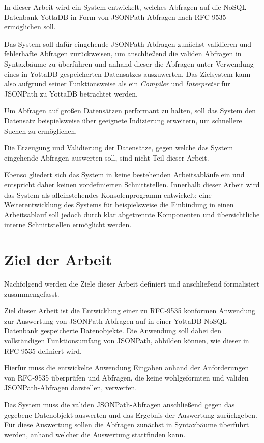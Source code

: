 \documentclass[oneside]{ausarbeitung}
\begin{document}
	In dieser Arbeit wird ein System entwickelt, welches Abfragen auf die NoSQL-Datenbank YottaDB in Form von JSONPath-Abfragen nach RFC-9535 ermöglichen soll. 
	
	Das System soll dafür eingehende JSONPath-Abfragen zunächst validieren und fehlerhafte Abfragen zurückweisen, um anschließend die validen Abfragen in Syntaxbäume zu überführen und anhand dieser die Abfragen unter Verwendung eines in YottaDB gespeicherten Datensatzes auszuwerten. Das Zielsystem kann also aufgrund seiner Funktionsweise als ein \textit{Compiler} und \textit{Interpreter} für JSONPath zu YottaDB betrachtet werden.
	
	Um Abfragen auf großen Datensätzen performant zu halten, soll das System den Datensatz beispielsweise über geeignete Indizierung erweitern, um schnellere Suchen zu ermöglichen.
	
	Die Erzeugung und Validierung der Datensätze, gegen welche das System eingehende Abfragen auswerten soll, sind nicht Teil dieser Arbeit. 
	
	Ebenso gliedert sich das System in keine bestehenden Arbeitsabläufe ein und entspricht daher keinen vordefinierten Schnittstellen. Innerhalb dieser Arbeit wird das System als alleinstehendes Konsolenprogramm entwickelt; eine Weiterentwicklung des Systems für beispielsweise die Einbindung in einen Arbeitsablauf soll jedoch durch klar abgetrennte Komponenten und übersichtliche interne Schnittstellen ermöglicht werden.
	
	
	
	\section{Ziel der Arbeit}
	\label{sect_ziel_der_arbeit}
	
	Nachfolgend werden die Ziele dieser Arbeit definiert und anschließend formalisiert zusammengefasst.
	
	Ziel dieser Arbeit ist die Entwicklung einer zu RFC-9535 konformen Anwendung zur Auswertung von JSONPath-Abfragen auf in einer YottaDB NoSQL-Datenbank gespeicherte Datenobjekte. Die Anwendung soll dabei den vollständigen Funktionsumfang von JSONPath, abbilden können, wie dieser in RFC-9535 definiert wird.
	
	Hierfür muss die entwickelte Anwendung Eingaben anhand der Anforderungen von RFC-9535 überprüfen und Abfragen, die keine wohlgeformten und validen JSONPath-Abfragen darstellen, verwerfen. 
	
	Das System muss die validen JSONPath-Abfragen anschließend gegen das gegebene Datenobjekt auswerten und das Ergebnis der Auswertung zurückgeben. Für diese Auswertung sollen die Abfragen zunächst in Syntaxbäume überführt werden, anhand welcher die Auswertung stattfinden kann.
	
\end{document}
